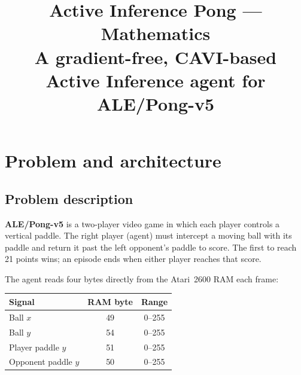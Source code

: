 \documentclass[12pt, a4paper]{article}
\title{\textbf{Active Inference Pong --- Mathematics}\\[0.5em]
  \large A gradient-free, CAVI-based Active Inference agent for ALE/Pong-v5}
\author{}
\date{}
\newcommand{\1}{\mathbf{1}}
\begin{document}

\maketitle

\begin{center}
\end{center}

\tableofcontents
\newpage

\section{Problem and architecture}
\label{sec:0}

\subsection{Problem description}
\label{sec:0.1}

\textbf{ALE/Pong-v5} is a two-player video game in which each player controls a
vertical paddle.  The right player (agent) must intercept a moving ball with its
paddle and return it past the left opponent's paddle to score.  The first to reach
21 points wins; an episode ends when either player reaches that score.

The agent reads four bytes directly from the Atari~2600 RAM each frame:

\begin{table}[ht]
\centering
\begin{tabular}{lcc}
\toprule
Signal & RAM byte & Range \\
\midrule
Ball $x$ & 49 & 0--255 \\
Ball $y$ & 54 & 0--255 \\
Player paddle $y$ & 51 & 0--255 \\
Opponent paddle $y$ & 50 & 0--255 \\
\bottomrule
\end{tabular}
\end{table}
\end{document}
